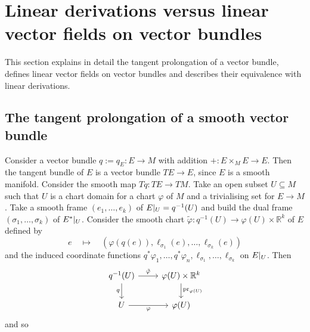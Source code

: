 \documentclass{amsart}
\theoremstyle{plain}
\newcommand{\R}{\mathbb{R}}
\newcommand{\inv}{^{-1}}
\newcommand{\an}[1]{\arrowvert_{#1}}
\DeclareMathOperator{\pr}{pr}
\begin{document}
\section{Linear derivations versus linear vector fields on vector bundles}
This section explains in detail the tangent prolongation of a vector bundle, defines linear vector fields on vector bundles and describes their equivalence with linear derivations.
\subsection{The tangent prolongation of a smooth vector bundle}
Consider a vector bundle $q:=q_E\colon E\to M$ with addition $+\colon E\times_ME\to E$. Then the tangent bundle of $E$ is a vector bundle $TE\to E$, since $E$ is a smooth manifold. 
Consider the smooth map $Tq\colon TE\to TM$. Take an open subset $U\subseteq M$ such that $U$ is a chart domain for a chart $\varphi$ of  $M$ and a trivialising set for $E\to M$. Take a smooth frame $(e_1,\ldots, e_k)$ of $E\an U=q^{-1}(U)$ and build the dual frame $(\sigma_1,\ldots, \sigma_k)$ of $E^*\an{U}$.
Consider the smooth chart $\tilde\varphi\colon q\inv(U)\to \varphi(U)\times \R^k$ of $E$ defined by 
\[ e %
\quad \mapsto\quad %
\left(\varphi(q(e)), \ell_{\sigma_1}(e), \ldots,  \ell_{\sigma_k}(e)\right)
\]
and the induced coordinate functions $q^*\varphi_1, \ldots, q^*\varphi_n, \ell_{\sigma_1}, \ldots, \ell_{\sigma_k}$ on $E\an{U}$.
Then %
\[\begin{tikzcd}
	{q^{-1}(U)} & {\varphi(U)\times\mathbb R^k} \\
	U & {\varphi(U)}
	\arrow["{\tilde\varphi}", from=1-1, to=1-2]
	\arrow["q"', from=1-1, to=2-1]
	\arrow["{\pr_{\varphi(U)}}", from=1-2, to=2-2]
	\arrow["\varphi"', from=2-1, to=2-2]
\end{tikzcd}\]
and so 
\end{document}
